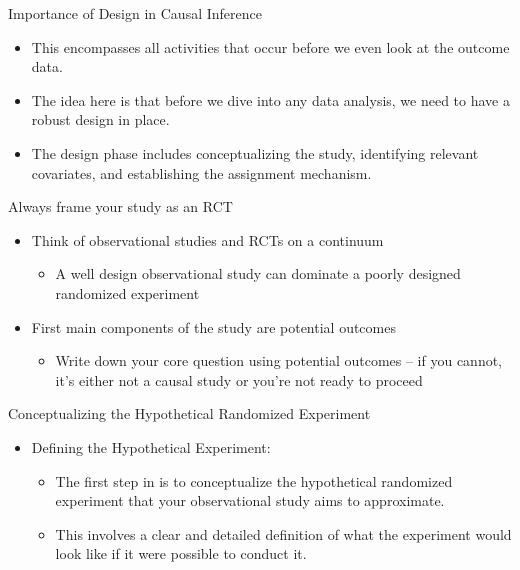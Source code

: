 \documentclass{beamer}
\begin{document}
\begin{frame}{Importance of Design in Causal Inference}
    	\begin{itemize}
	\item This encompasses all activities that occur before we even look at the outcome data. 
	\item The idea here is that before we dive into any data analysis, we need to have a robust design in place. 
	\item The design phase includes conceptualizing the study, identifying relevant covariates, and establishing the assignment mechanism.
	\end{itemize}
\end{frame}






\begin{frame}{Always frame your study as an RCT}

\begin{itemize}

\item Think of observational studies and RCTs on a continuum 
	\begin{itemize}
	\item A well design observational study can dominate a poorly designed randomized experiment
	\end{itemize}
\item First main components of the study are potential outcomes 
	\begin{itemize}
	\item Write down your core question using potential outcomes -- if you cannot, it's either not a causal study or you're not ready to proceed
	\end{itemize}
\end{itemize}

\end{frame}



\begin{frame}{Conceptualizing the Hypothetical Randomized Experiment}
  \begin{itemize}
    \item Defining the Hypothetical Experiment:
      \begin{itemize}
        \item The first step in is to conceptualize the hypothetical randomized experiment that your observational study aims to approximate.
        \item This involves a clear and detailed definition of what the experiment would look like if it were possible to conduct it.
      \end{itemize}
  \end{itemize}
\end{frame}
\end{document}
